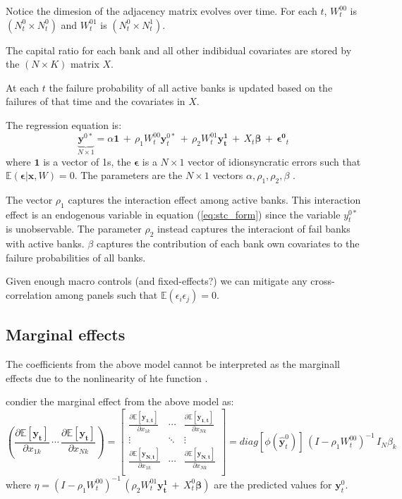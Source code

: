 \documentclass[11pt,final]{article}%
\newcommand{\vect}[1]{\bm{#1}}
\begin{document}
Notice the dimesion of the adjacency matrix evolves over time. For each $t$, $W^{00}_{t}$ is $(N^{0}_{t} \times N^{0}_{t})$ and $W^{01}_{t}$ is $(N^{0}_{t} \times N^{1}_{t})$.

The capital ratio for each bank and all other indibidual covariates are stored by the $(N \times K)$ matrix $X$.

At each $t$ the failure probability of all active banks is updated based on the failures of that time and the covariates in $X$. 

The regression equation is:
\begin{equation}
	\underbrace{\vect{y}^{0*}}_{N \times 1} = \alpha \vect{1} \,+\, \rho_{1}  W^{00}_{t} \vect{y}^{0*}_{t} \,+\, \rho_{2} W^{01}_{t} \vect{y^{1}_{t}}  \,+\, X_{t} \vect{\beta} \,+\, \vect{\epsilon^{0}}_{t}
    \label{eq:stc_form}
\end{equation}
where $\vect{1}$ is a vector of 1s, the $\vect{\epsilon}$ is a $N \times 1$ vector of idionsyncratic errors such that $\mathbb{E}(\vect{\epsilon} | \vect{x}, W)=0$. 
The parameters are the $N \times 1$ vectors $\alpha, \rho_1, \rho_2, \beta$ . 

The vector $\rho_1$ captures the interaction effect among active banks.  This interaction effect is an endogenous variable in equation (\ref{eq:stc_form}) since the variable $y_{t}^{0*}$ is unobservable. The parameter $\rho_2$ instead captures the interaciont of fail banks with active banks. $\beta$ captures the contribution of each bank own covariates to the failure probabilities of all banks. 

Given enough macro controls (and fixed-effects?) we can mitigate any cross-correlation among panels such that $\mathbb{E}(\epsilon_{i} \epsilon_{j}) = 0$. 

\subsection{Marginal effects}
The coefficients from the above model cannot be interpreted as the marginall effects due to the nonlinearity of hte function . 

\cite{Elhorst2017} condier the marginal effect from the above model as:
\begin{equation}
\left( \frac{\partial \mathbb{E}[\vect{y_t}]  }{\partial x_{1k}} \, \cdots \, \frac{\partial \mathbb{E}[\vect{y_t}]  }{\partial x_{Nk}} \right) = 
\begin{bmatrix}
\frac{\partial \mathbb{E}[\vect{y_{1,t}}]  }{\partial x_{1k}}	&	\cdots 	&	\frac{\partial \mathbb{E}[\vect{y_{1,t}}]  }{\partial x_{Nk}}	\\
\vdots 	&	\ddots 	& \vdots  \\
\frac{\partial \mathbb{E}[\vect{y_{N,t}}]  }{\partial x_{1k}}	&	\cdots 	&	\frac{\partial \mathbb{E}[\vect{y_{N,t}}]  }{\partial x_{Nk}}	\\
\end{bmatrix}
=
diag[ \phi(\hat{\vect{y}}^{0}_{t}) ] \, (I - \rho_{1} W_{t}^{00})^{-1} \, I_{N} \beta_{k}
\label{eq:marginal_effects}
\end{equation}
where $\eta = (I - \rho_{1} W_{t}^{00})^{-1} \, (\rho_{2} W_{t}^{01} \vect{y_{t}^{1}} \,+\, X_{t}^{0} \vect{\beta} )$ are the predicted values for $\vect{y}^{0}_{t}$.
\end{document}
